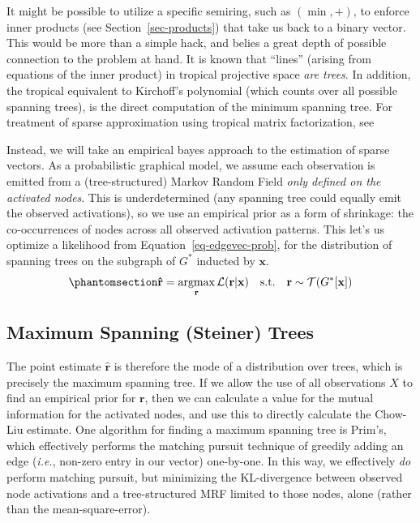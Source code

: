 \documentclass[%
	12pt,
		oneside,
		letterpaper
]{book}
\begin{document}
It might be possible to utilize a specific semiring, such as \((\min,+)\), to enforce inner products (see Section~\ref{sec-products}) that take us back to a binary vector.
This would be more than a simple hack, and belies a great depth of possible connection to the problem at hand.
It is known that ``lines'' (arising from equations of the inner product) in tropical projective space \emph{are trees}.\autocite{tropicalGrassmannian_2004}
In addition, the tropical equivalent to Kirchoff's polynomial (which counts over all possible spanning trees), is the direct computation of the minimum spanning tree.\autocite{TropicalKirchhoffsformula_Jukna2021}
For treatment of sparse approximation using tropical matrix factorization, see \textcite{Sparsedataembedding_Omanovic2021}

Instead, we will take an empirical bayes approach to the estimation of sparse vectors.\autocite{EmpiricalBayesianStrategy_Wipf2007}
As a probabilistic graphical model, we assume each observation is emitted from a (tree-structured) Markov Random Field \emph{only defined on the activated nodes}.
This is underdetermined (any spanning tree could equally emit the observed activations), so we use an empirical prior as a form of shrinkage: the co-occurrences of nodes across all observed activation patterns.
This let's us optimize a likelihood from Equation~\ref{eq-edgevec-prob}, for the distribution of spanning trees on the subgraph of \(G^*\) inducted by \(\mathbf{x}\).
\begin{equation}\phantomsection\label{eq-sparse-approx-tree}{
\mathbf{\hat{r}} = \operatorname*{argmax}_{\mathbf{r}}{\mathcal{L}(\mathbf{r}|\mathbf{x})} \quad \text{s.t.}\quad \mathbf{r}\sim \mathcal{T}(G^*[\mathbf{x}])
}\end{equation}

\subsection{Maximum Spanning (Steiner) Trees}\label{sec-steiner}

The point estimate \(\hat{\mathbf{r}}\) is therefore the mode of a distribution over trees, which is precisely the maximum spanning tree.\autocite{EfficientComputationExpectations_Zmigrod2021}
If we allow the use of all observations \(X\) to find an empirical prior for \(\mathbf{r}\), then we can calculate a value for the mutual information for the activated nodes, and use this to directly calculate the Chow-Liu estimate.
One algorithm for finding a maximum spanning tree is Prim's\autocite{Datastructuresnetwork_Tarjan1983}, which effectively performs the matching pursuit technique of greedily adding an edge (\emph{i.e.}, non-zero entry in our vector) one-by-one.
In this way, we effectively \emph{do} perform matching pursuit, but minimizing the KL-divergence between observed node activations and a tree-structured MRF limited to those nodes, alone (rather than the mean-square-error).
\end{document}
